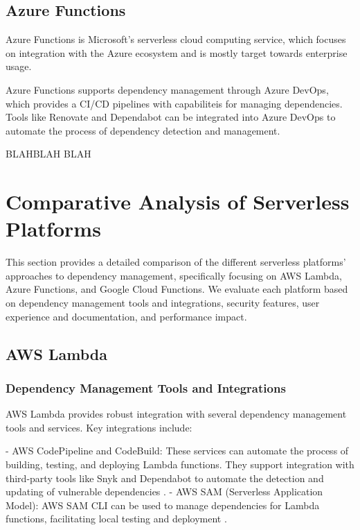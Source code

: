 \documentclass[12pt, letterpaper]{article}
\begin{document}
\subsection{Azure Functions}

Azure Functions is Microsoft's serverless cloud computing service, which focuses on integration with the Azure ecosystem and is mostly target towards enterprise usage. 

Azure Functions supports dependency management through Azure DevOps, which provides a CI/CD pipelines with capabiliteis for managing dependencies. Tools like Renovate and Dependabot can be integrated into Azure DevOps to automate the process of dependency detection and management. 

BLAHBLAH BLAH 

\section{Comparative Analysis of Serverless Platforms}

This section provides a detailed comparison of the different serverless platforms' approaches to dependency management, specifically focusing on AWS Lambda, Azure Functions, and Google Cloud Functions. We evaluate each platform based on dependency management tools and integrations, security features, user experience and documentation, and performance impact.

\subsection{AWS Lambda}

\subsubsection{Dependency Management Tools and Integrations}

AWS Lambda provides robust integration with several dependency management tools and services. Key integrations include:

- AWS CodePipeline and CodeBuild: These services can automate the process of building, testing, and deploying Lambda functions. They support integration with third-party tools like Snyk and Dependabot to automate the detection and updating of vulnerable dependencies \cite{awsCI2023}.
- AWS SAM (Serverless Application Model): AWS SAM CLI can be used to manage dependencies for Lambda functions, facilitating local testing and deployment \cite{awssam2023}.
\end{document}
